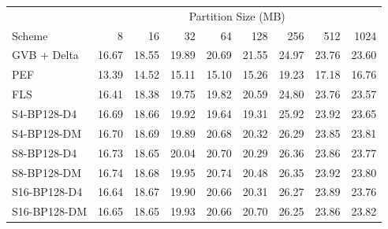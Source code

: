 \begin{tabular}{lrrrrrrrr}
\toprule
 & \multicolumn{8}{c}{Partition Size (MB)} \\
Scheme & 8 & 16 & 32 & 64 & 128 & 256 & 512 & 1024 \\
\midrule
GVB + Delta & 16.67 & 18.55 & 19.89 & 20.69 & 21.55 & 24.97 & 23.76 & 23.60 \\
PEF & 13.39 & 14.52 & 15.11 & 15.10 & 15.26 & 19.23 & 17.18 & 16.76 \\
FLS & 16.41 & 18.38 & 19.75 & 19.82 & 20.59 & 24.80 & 23.76 & 23.57 \\
S4-BP128-D4 & 16.69 & 18.66 & 19.92 & 19.64 & 19.31 & 25.92 & 23.92 & 23.65 \\
S4-BP128-DM & 16.70 & 18.69 & 19.89 & 20.68 & 20.32 & 26.29 & 23.85 & 23.81 \\
S8-BP128-D4 & 16.73 & 18.65 & 20.04 & 20.70 & 20.29 & 26.36 & 23.86 & 23.77 \\
S8-BP128-DM & 16.74 & 18.68 & 19.95 & 20.74 & 20.48 & 26.35 & 23.92 & 23.80 \\
S16-BP128-D4 & 16.64 & 18.67 & 19.90 & 20.66 & 20.31 & 26.27 & 23.89 & 23.76 \\
S16-BP128-DM & 16.65 & 18.65 & 19.93 & 20.66 & 20.70 & 26.25 & 23.86 & 23.82 \\
\bottomrule
\end{tabular}
